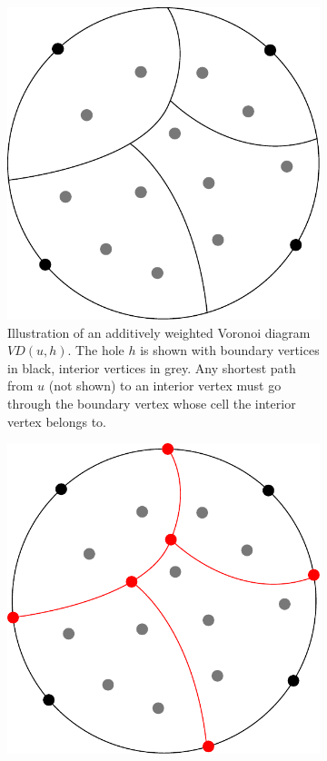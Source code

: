 \begin{figure}
  \centering
  \caption{}
  \begin{subfigure}[b]{0.45\textwidth}
    \includegraphics[width=\textwidth]{figs/awvd1.pdf}
    \caption{Illustration of an additively weighted Voronoi diagram $VD(u,h)$. The hole
    $h$ is shown with boundary vertices in black, interior vertices in grey. Any shortest path
  from $u$ (not shown) to an interior vertex must go through the boundary vertex whose
cell the interior vertex belongs to.}
    \label{awvd1}
  \end{subfigure}
  \quad
  \begin{subfigure}[b]{0.45\textwidth}
    \includegraphics[width=\textwidth]{figs/awvd2.pdf}

\end{subfigure}
\end{figure}

